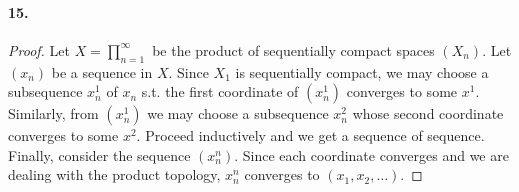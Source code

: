 \paragraph{15.}
\begin{proof}
  Let $X = \prod_{n=1}^\infty$ be the product of sequentially compact spaces
  $(X_n)$. Let $(x_n)$ be a sequence in $X$. Since $X_1$ is sequentially
  compact, we may choose a subsequence $x_n^1$ of $x_n$ s.t. the first
  coordinate of $(x_n^1)$ converges to some $x^1$. Similarly, from $(x_n^1)$ we
  may choose a subsequence $x_n^2$ whose second coordinate converges to some
  $x^2$. Proceed inductively and we get a sequence of sequence. Finally,
  consider the sequence $(x_n^n)$. Since each coordinate converges and we are
  dealing with the product topology, $x_n^n$ converges to $(x_1, x_2, \dots)$.
\end{proof}




















